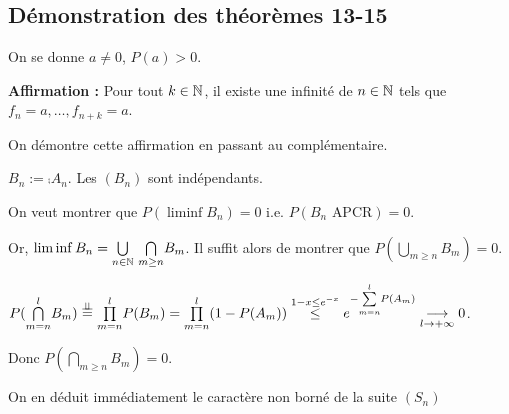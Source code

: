\documentclass[10pt,a4paper,notitlepage ]{report}
\begin{document}
\subsection{Démonstration des théorèmes 13-15}

\begin{demo}[Théorème 13]
	On se donne $a\ne 0$, $P(a) > 0$.
	 
	\textbf{\quad Affirmation :} Pour tout $k\in\mathbb N$, il existe une infinité de $n\in\mathbb N$ tels que $f_n = a, \dots, f_{n+k} = a$.
	\begin{demo}
		On démontre cette affirmation en passant au complémentaire.
		
		$B_n := \comp{A_n}$. Les $(B_n)$ sont indépendants.
		
		On veut montrer que $P(\liminf B_n) = 0$ i.e. $P(B_n \text{ APCR}) = 0$.
		
		Or, $\liminf B_n = \underset {n\in\mathbb N} \bigcup \  \underset{m\ge n}\bigcap B_m$. Il suffit alors de montrer que $P(\underset{m\ge n}\bigcup B_m) = 0$.
		
		$P(\underset{m=n}{\overset l \bigcap} B_m) \overset{\perp \!\!\! \perp} = \underset{m=n} {\overset l \prod} P(B_m) = \underset{m=n}{\overset l \prod}(1-P(A_m)) \overset{1-x \le e^{-x}} \le e^{-\underset{m=n}{\overset l \sum} P(A_m)} \underset{l\rightarrow +\infty} \longrightarrow 0$.
		
		Donc $P(\underset{m\ge n} \bigcap B_m) = 0$.
	\end{demo}
	
	On en déduit immédiatement le caractère non borné de la suite $(S_n)$
\end{demo}
\end{document}
